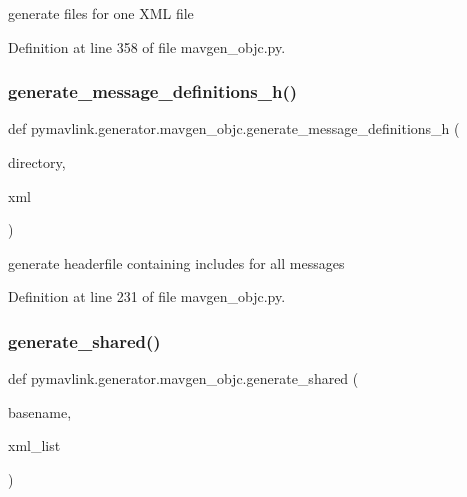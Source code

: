\begin{DoxyVerb}generate files for one XML file\end{DoxyVerb}
 

Definition at line 358 of file mavgen\+\_\+objc.\+py.

\mbox{\label{namespacepymavlink_1_1generator_1_1mavgen__objc_a2cf69803028e8d4f40edf1eeb561f996}} 
\subsubsection{\texorpdfstring{generate\_message\_definitions\_h()}{generate\_message\_definitions\_h()}}
{\footnotesize\ttfamily def pymavlink.\+generator.\+mavgen\+\_\+objc.\+generate\+\_\+message\+\_\+definitions\+\_\+h (\begin{DoxyParamCaption}\item[{}]{directory,  }\item[{}]{xml }\end{DoxyParamCaption})}

\begin{DoxyVerb}generate headerfile containing includes for all messages\end{DoxyVerb}
 

Definition at line 231 of file mavgen\+\_\+objc.\+py.

\mbox{\label{namespacepymavlink_1_1generator_1_1mavgen__objc_a677ef15fb3fb65545a5a589e513b7fe4}} 
\subsubsection{\texorpdfstring{generate\_shared()}{generate\_shared()}}
{\footnotesize\ttfamily def pymavlink.\+generator.\+mavgen\+\_\+objc.\+generate\+\_\+shared (\begin{DoxyParamCaption}\item[{}]{basename,  }\item[{}]{xml\+\_\+list }\end{DoxyParamCaption})}



